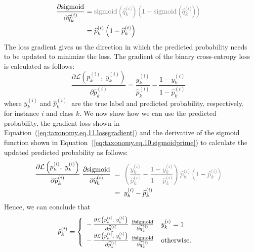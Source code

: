 \documentclass[authoryear,preprint,review,12pt]{elsarticle}
\begin{document}
\begin{align}
    \label{eq:taxonomy.eq.10.sigmoidprime}
    \frac{\partial{\text{sigmoid}}}{\partial{\widehat{q}_k^{(i)}}}
    & = \textcolor{gray}{\text{sigmoid}\left(\widehat{q}_k^{(i)}\right)\left(1-\text{sigmoid}\left(\widehat{q}_k^{(i)}\right)\right)}
    \\
    & = \widehat{p}_k^{(i)}\left(1-\widehat{p}_k^{(i)}\right)
\end{align}
The loss gradient gives us the direction in which the predicted probability needs to be updated to minimize the loss. The gradient of the binary cross-entropy loss is calculated as follows:
\begin{equation}
    \label{eq:taxonomy.eq.11.lossgradient}
    \frac{\partial \mathcal{L} \left( \widehat{p}_k^{(i)},\;y_k^{(i)}\right)}{\partial \widehat{p}_k^{(i)} }=\frac{y_k^{(i)}}{\widehat{p}_k^{(i)}}-\frac{1-y_k^{(i)}}{1-\widehat{p}_k^{(i)}}
\end{equation}
where $y_k^{(i)}\; $and $\widehat{p}_k^{(i)}\; $ are the true label and predicted probability, respectively, for instance $i $ and class $k $.
We now show how we can use the predicted probability, the gradient loss shown in Equation~(\ref{eq:taxonomy.eq.11.lossgradient}) and the derivative of the sigmoid function shown in Equation~(\ref{eq:taxonomy.eq.10.sigmoidprime}) to calculate the updated predicted probability as follows:
\begin{align}
    \label{eq:taxonomy.eq.12.newpredelement}
    \frac{\partial \mathcal{L}\left(p_k^{(i)},\; y_k^{(i)}\right)}{\partial \widehat{p}_k^{(i)} }\; \frac{\partial{\text{sigmoid}}}{\partial{\widehat{q}_k^{(i)}}}
    & \; = \; \textcolor{gray}{\left(\frac{y_k^{(i)}}{\widehat{p}_k^{(i)}}-\frac{1-y_k^{(i)}}{1-\widehat{p}_k^{(i)}}\right)\widehat{p}_k^{(i)}\left(1-\widehat{p}_k^{(i)}\right) }
    \\
    & \; = \; y_k^{(i)}-\widehat{p}_k^{(i)}
\end{align}
Hence, we can conclude that
\begin{equation}
    \label{eq:taxonomy.eq.13.newpred}
    \begin{array}{@{}l}
    \hat{p}_{k}^{(i)} = \left\{
        \begin{array}{ll}
            -\, \frac{\partial \mathcal{L}\left(p_k^{(i)},\;y_k^{(i)}\right)}{\partial \widehat{p}_k^{(i)} }\;{ \frac{\partial{\text{sigmoid}}}{\partial{\widehat{q}_k^{(i)}}}}
            &
            y_k^{(i)}=1
            \\
            -\,\frac{\partial \mathcal{L}\left(p_k^{(i)},\;y_k^{(i)}\right)}{\partial \widehat{p}_k^{(i)} }\; {\frac{\partial{\text{sigmoid}}}{\partial{\widehat{q}_k^{(i)}}}}
            &
            \text{otherwise.}
        \end{array}\right.
    \end{array}
\end{equation}
\end{document}
